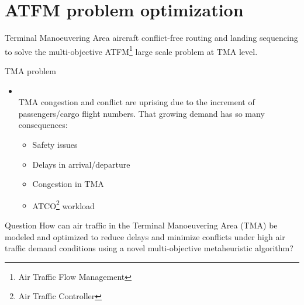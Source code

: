 \section{ATFM problem optimization}
\begin{frame}{}

    Terminal Manoeuvering Area aircraft conflict-free routing and landing sequencing to solve the multi-objective ATFM\footnote{Air Traffic Flow Management} large scale problem at TMA level.
    \vfill
    \begin{flushleft}\scriptsize
    \end{flushleft}
\end{frame}
\begin{frame}{TMA problem}
    \begin{itemize}
        \item<+-> \\
              TMA congestion and conflict are uprising due to the increment of passengers/cargo flight numbers. That growing demand has so many
              consequences:\\
              \begin{itemize}[itemsep=1mm]\small
                  \item Safety issues
                  \item Delays in arrival/departure
                  \item Congestion in TMA
                  \item ATCO\footnote{Air Traffic Controller} workload
              \end{itemize}
    \end{itemize}
    \small
    \begin{questionBox}
        {Question}{
            How can air traffic in the Terminal Manoeuvering Area (TMA) be modeled and optimized to reduce delays and minimize conflicts under high air traffic demand conditions using a novel multi-objective metaheuristic algorithm?}
    \end{questionBox}
\end{frame}
